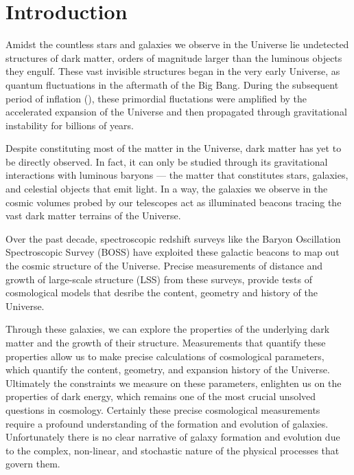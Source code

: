\chapter*{Introduction}
Amidst the countless stars and galaxies we observe in the Universe lie 
undetected structures of dark matter, orders of magnitude larger than 
the luminous objects they engulf. These vast invisible structures began 
in the very early Universe, as quantum fluctuations in the aftermath of 
the Big Bang. 
During the subsequent period of inflation (), these primordial fluctations 
were amplified by the accelerated expansion of the Universe and then 
propagated through gravitational instability for billions of years. 

Despite constituting most of the matter in the Universe, dark matter 
has yet to be directly observed. In fact, it can only be studied through 
its gravitational interactions with luminous baryons — the matter that 
constitutes stars, galaxies, and celestial objects that emit light. 
In a way, the galaxies we observe in the cosmic volumes probed by our 
telescopes act as illuminated beacons tracing the vast dark matter 
terrains of the Universe.

Over the past decade, spectroscopic redshift surveys like the 
Baryon Oscillation Spectroscopic Survey (BOSS) have 
exploited these galactic beacons to map out the cosmic structure
of the Universe. Precise measurements of distance and growth 
of large-scale structure (LSS) from these surveys, provide tests 
of cosmological models that desribe the content, geometry and history 
of the Universe. 


Through these galaxies, we can explore the properties of the underlying dark matter
and the growth of their structure. Measurements that quantify these properties allow us to make
precise calculations of cosmological parameters, which quantify the content, geometry, and
expansion history of the Universe. Ultimately the constraints we measure on these parameters,
enlighten us on the properties of dark energy, which remains one of the most crucial unsolved
questions in cosmology. Certainly these precise cosmological measurements require a profound
understanding of the formation and evolution of galaxies. Unfortunately there is no clear
narrative of galaxy formation and evolution due to the complex, non-linear, and stochastic nature
of the physical processes that govern them.

